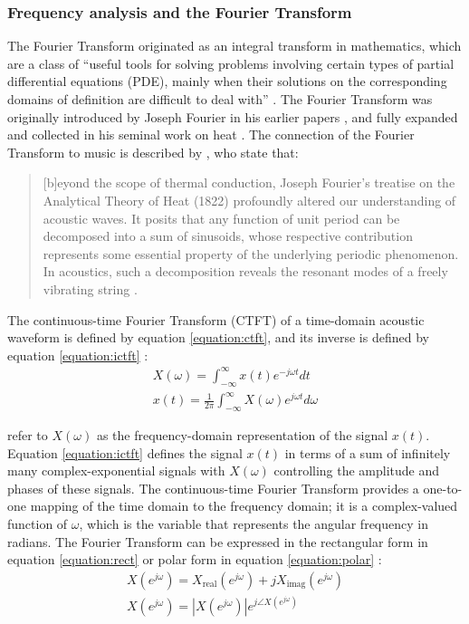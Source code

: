 \documentclass[report.tex]{subfiles}
\begin{document}
\subsubsection{Frequency analysis and the Fourier Transform}
\label{sec:freqanal}

The Fourier Transform originated as an integral transform in mathematics, which are a class of ``useful tools for solving problems involving certain types of partial differential equations (PDE), mainly when their solutions on the corresponding domains of definition are difficult to deal with'' \parencite[54]{fourierhistory}. The Fourier Transform was originally introduced by Joseph Fourier in his earlier papers \parencite{fourierhist1, fourierhist2}, and fully expanded and collected in his seminal work on heat \parencite{fourierheat}. The connection of the Fourier Transform to music is described by \citeauthor{fouriermusic}, who state that:

\begin{quote}
	[b]eyond the scope of thermal conduction, Joseph Fourier's treatise on the Analytical Theory of Heat (1822) profoundly altered our understanding of acoustic waves. It posits that any function of unit period can be decomposed into a sum of sinusoids, whose respective contribution represents some essential property of the underlying periodic phenomenon. In acoustics, such a decomposition reveals the resonant modes of a freely vibrating string \parencite[461]{fouriermusic}.
\end{quote}

The continuous-time Fourier Transform (CTFT) of a time-domain acoustic waveform is defined by equation \eqref{equation:ctft}, and its inverse is defined by equation \eqref{equation:ictft} \parencite[308]{dspfirst}:
\begin{align}
	X(\omega) = \int_{-\infty}^{\infty}{x(t)e^{-j\omega t}\mathit{dt}} \tag{1}\label{equation:ctft} \\
	x(t) = \frac{1}{2\pi}\int_{-\infty}^{\infty}{X(\omega)e^{j\omega t}\mathit{d\omega}} \tag{2}\label{equation:ictft}
\end{align}

\textcite{dspfirst} refer to $X(\omega)$ as the frequency-domain representation of the signal $x(t)$. Equation \eqref{equation:ictft} defines the signal $x(t)$ in terms of a sum of infinitely many complex-exponential signals with $X(\omega)$ controlling the amplitude and phases of these signals. The continuous-time Fourier Transform provides a one-to-one mapping of the time domain to the frequency domain; it is a complex-valued function of $\omega$, which is the variable that represents the angular frequency in radians. The Fourier Transform can be expressed in the rectangular form in equation \eqref{equation:rect} or polar form in equation \eqref{equation:polar} \parencite[49]{discretebook}:
\begin{align}
	X(e^{j\omega}) = X_{\text{real}}(e^{j\omega}) + j X_{\text{imag}}(e^{j\omega}) \tag{3}\label{equation:rect} \\
	X(e^{j\omega}) = |X(e^{j\omega})|e^{j\angle X(e^{j\omega})} \tag{4}\label{equation:polar}
\end{align}
\end{document}

